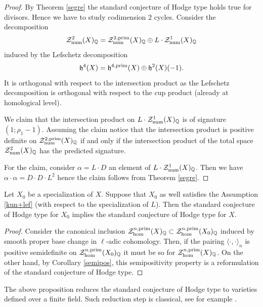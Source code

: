 \documentclass[11pt]{amsart}
\begin{document}
\begin{proof}
By Theorem \ref{segre} the standard conjecture of Hodge type holds true for divisors.  Hence we have to study codimension $2$ cycles.
Consider the decomposition \[\mathcal{Z}^{2}_{\mathrm{num}}(X)_{\mathbb{Q}} = \mathcal{Z}^{2,\mathrm{prim}}_{\mathrm{num}}(X)_{\mathbb{Q}} \oplus L \cdot \mathcal{Z}^{1}_{\mathrm{num}}(X)_{\mathbb{Q}}\] induced by the Lefschetz decomposition \[\mathfrak{h}^{4}(X)=\mathfrak{h}^{4,\mathrm{prim}}(X) \oplus \mathfrak{h}^{2}(X)(-1).\]  It is orthogonal with respect to the intersection product as the Lefschetz decomposition is orthogonal with respect to the cup product (already at homological level).

We claim that the intersection product on  $L \cdot \mathcal{Z}^{1}_{\mathrm{num}}(X)_{\mathbb{Q}}$ is of signature $(1;  \rho_1-1)$. Assuming the claim notice that  the intersection product is positive definite on $\mathcal{Z}^{2,\mathrm{prim}}_{\mathrm{num}}(X)_{\mathbb{Q}}$ if and only if the intersection product of the total space $\mathcal{Z}^2_{\mathrm{num}}(X)_{\mathbb{Q}}$ has the predicted signature.

For the claim, consider $\alpha=L \cdot D$ an element of $L \cdot \mathcal{Z}^{1}_{\mathrm{num}}(X)_{\mathbb{Q}}$. Then we have 
$\alpha\cdot \alpha = D \cdot D \cdot L^2$
hence the claim follows from Theorem \ref{segre}. 
\end{proof}
\begin{prop} \label{reducefinite}
Let $X_0$ be a specialization of $X$. Suppose that $X_0$ as well satisfies the Assumption \ref{kun+lef} (with respect to the specialization of $L$). Then the standard conjecture of Hodge type for $X_0$ implies the standard conjecture of Hodge type for $X$. 
\end{prop}
\begin{proof} Consider the canonical inclusion  $\mathcal{Z}_{\hom}^{n,\mathrm{prim}}(X)_{\mathbb{Q}}\subset \mathcal{Z}_{\hom}^{n,\mathrm{prim}}(X_0)_{\mathbb{Q}}$ induced by smooth proper base change in $\ell$-adic cohomology. Then, if the pairing $\langle \cdot, \cdot \rangle_{n}$  is positive semidefinite  on $\mathcal{Z}_{\hom}^{n,\mathrm{prim}}(X_0)_{\mathbb{Q}}$ it must be so for  $\mathcal{Z}_{\hom}^{n,\mathrm{prim}}(X)_{\mathbb{Q}} $. On the other hand, by Corollary \ref{semipos}, this semipositivity property is a reformulation of the standard conjecture of Hodge type.
\end{proof}
\begin{remark}
The above proposition reduces the standard conjecture of Hodge type to varieties defined over a finite field. Such reduction step is classical, see for example \cite[Remark 5.3.2.2(2)]{Andmot}.
\end{remark}
\end{document}
